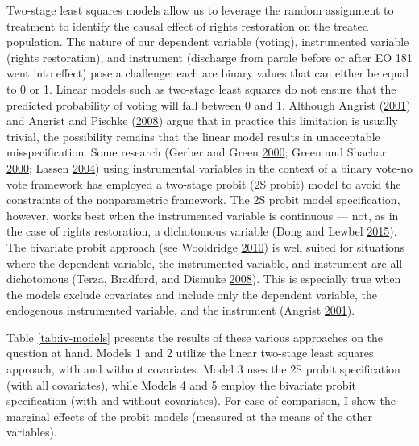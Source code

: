\documentclass[
  12pt,
]{article}
\begin{document}
Two-stage least squares models allow us to leverage the random assignment to treatment to identify the causal effect of rights restoration on the treated population. The nature of our dependent variable (voting), instrumented variable (rights restoration), and instrument (discharge from parole before or after EO 181 went into effect) pose a challenge: each are binary values that can either be equal to 0 or 1. Linear models such as two-stage least squares do not ensure that the predicted probability of voting will fall between 0 and 1. Although Angrist (\protect\hyperlink{ref-Angrist2001}{2001}) and Angrist and Pischke (\protect\hyperlink{ref-Angrist2008}{2008}) argue that in practice this limitation is usually trivial, the possibility remains that the linear model results in unacceptable misspecification. Some research (Gerber and Green \protect\hyperlink{ref-Gerber2000}{2000}; Green and Shachar \protect\hyperlink{ref-Green2000}{2000}; Lassen \protect\hyperlink{ref-Lassen2004}{2004}) using instrumental variables in the context of a binary vote-no vote framework has employed a two-stage probit (2S probit) model to avoid the constraints of the nonparametric framework. The 2S probit model specification, however, works best when the instrumented variable is continuous --- not, as in the case of rights restoration, a dichotomous variable (Dong and Lewbel \protect\hyperlink{ref-Dong2015}{2015}). The bivariate probit approach (see Wooldridge \protect\hyperlink{ref-Wooldridge2010}{2010}) is well suited for situations where the dependent variable, the instrumented variable, and instrument are all dichotomous (Terza, Bradford, and Dismuke \protect\hyperlink{ref-Terza2008}{2008}). This is especially true when the models exclude covariates and include only the dependent variable, the endogenous instrumented variable, and the instrument (Angrist \protect\hyperlink{ref-Angrist2001}{2001}).

Table \ref{tab:iv-models} presents the results of these various approaches on the question at hand. Models 1 and 2 utilize the linear two-stage least squares approach, with and without covariates. Model 3 uses the 2S probit specification (with all covariates), while Models 4 and 5 employ the bivariate probit specification (with and without covariates). For ease of comparison, I show the marginal effects of the probit models (measured at the means of the other variables).
\end{document}
